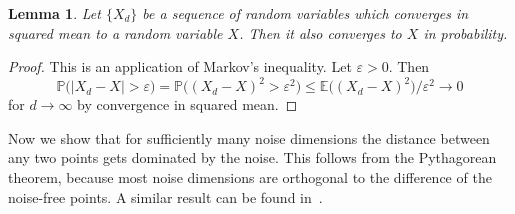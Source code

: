 \documentclass{article}
\theoremstyle{plain}
\newtheorem{lemma}[theorem]{Lemma}
\theoremstyle{definition}
\theoremstyle{remark}
\begin{document}
\begin{lemma}\label{lem:conv_sq_mean_prob}
Let $\{X_d\}$ be a sequence of random variables which converges in squared mean to a random variable $X$. Then it also converges to $X$ in probability.
\end{lemma}
\begin{proof}
    This is an application of Markov's inequality. Let $\varepsilon >0$. Then 
    $$\mathbb{P}\big(|X_d - X| > \varepsilon \big) = \mathbb{P}\big((X_d-X)^2 > \varepsilon^2\big) \leq \mathbb{E}\big((X_d-X)^2\big) / \varepsilon^2 \to 0$$
    for $d\to \infty$ by convergence in squared mean.
\end{proof}


Now we show that for sufficiently many noise dimensions the distance between any two points gets dominated by the noise. This follows from the Pythagorean theorem, because most noise dimensions are orthogonal to the difference of the noise-free points. A similar result can be found in~\citet{hall2005geometric}.
\end{document}
